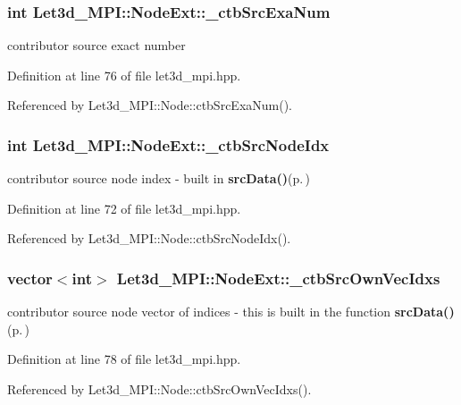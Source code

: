 \subsubsection{\setlength{\rightskip}{0pt plus 5cm}int {\bf Let3d\_\-MPI::Node\-Ext::\_\-ctb\-Src\-Exa\-Num}}\label{classLet3d__MPI_1_1NodeExt_538fc62b2c45b2ada8b9dbfcaf3ef68c_538fc62b2c45b2ada8b9dbfcaf3ef68c}


contributor source exact number 

Definition at line 76 of file let3d\_\-mpi.hpp.

Referenced by Let3d\_\-MPI::Node::ctb\-Src\-Exa\-Num().
\subsubsection{\setlength{\rightskip}{0pt plus 5cm}int {\bf Let3d\_\-MPI::Node\-Ext::\_\-ctb\-Src\-Node\-Idx}}\label{classLet3d__MPI_1_1NodeExt_a3c3354c76ff0106cc947402de3c346c_a3c3354c76ff0106cc947402de3c346c}


contributor source node index - built in {\bf src\-Data()}{\rm (p.\,\pageref{classLet3d__MPI_44ef9057a3adc0372c2569c172064dac_44ef9057a3adc0372c2569c172064dac})} 

Definition at line 72 of file let3d\_\-mpi.hpp.

Referenced by Let3d\_\-MPI::Node::ctb\-Src\-Node\-Idx().
\subsubsection{\setlength{\rightskip}{0pt plus 5cm}vector$<$int$>$ {\bf Let3d\_\-MPI::Node\-Ext::\_\-ctb\-Src\-Own\-Vec\-Idxs}}\label{classLet3d__MPI_1_1NodeExt_cb91796fade3f5534d933eaf52f29180_cb91796fade3f5534d933eaf52f29180}


contributor source node vector of indices - this is built in the function {\bf src\-Data()}{\rm (p.\,\pageref{classLet3d__MPI_44ef9057a3adc0372c2569c172064dac_44ef9057a3adc0372c2569c172064dac})} 

Definition at line 78 of file let3d\_\-mpi.hpp.

Referenced by Let3d\_\-MPI::Node::ctb\-Src\-Own\-Vec\-Idxs().
